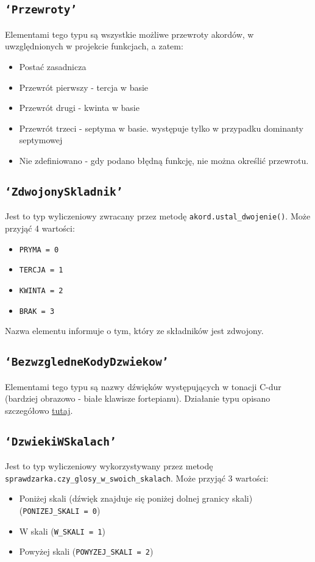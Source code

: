 \documentclass[dokumentacja.tex]{subfiles}
\begin{document}
\subsection{\texttt{`Przewroty'}}
Elementami tego typu są wszystkie możliwe przewroty akordów, w uwzględnionych w projekcie funkcjach, a zatem: 
\begin{itemize}
    \item Postać zasadnicza 
    \item Przewrót pierwszy - tercja w basie
    \item Przewrót drugi - kwinta w basie
    \item Przewrót trzeci - septyma w basie. występuje tylko w przypadku dominanty septymowej
    \item Nie zdefiniowano - gdy podano błędną funkcję, nie można określić przewrotu.
\end{itemize} 

\subsection{\texttt{`ZdwojonySkladnik'}}
Jest to typ wyliczeniowy zwracany przez metodę \texttt{akord.ustal\_dwojenie()}. Może przyjąć 4 wartości:
\begin{itemize}
    \item \texttt{PRYMA = 0}
    \item \texttt{TERCJA = 1}
    \item \texttt{KWINTA = 2}
    \item \texttt{BRAK = 3}
\end{itemize} 
Nazwa elementu informuje o tym, który ze składników jest zdwojony.


\subsection{\texttt{`BezwzgledneKodyDzwiekow'}}
Elementami tego typu są nazwy dźwięków występujących w tonacji C-dur (bardziej obrazowo - białe klawisze fortepianu). Działanie typu opisano szczegółowo \hyperref[punkt:bezwzglednyKodDzwieku]{tutaj}. 

\subsection{\texttt{`DzwiekiWSkalach'}}
Jest to typ wyliczeniowy wykorzystywany przez metodę \texttt{sprawdzarka.czy\_glosy\_w\_swoich\_skalach}. Może przyjąć 3 wartości:
\begin{itemize}
    \item Poniżej skali (dźwięk znajduje się poniżej dolnej granicy skali) (\texttt{PONIZEJ\_SKALI = 0}) 
    \item W skali (\texttt{W\_SKALI = 1}) 
    \item Powyżej skali (\texttt{POWYZEJ\_SKALI = 2}) 
\end{itemize} 
\end{document}
